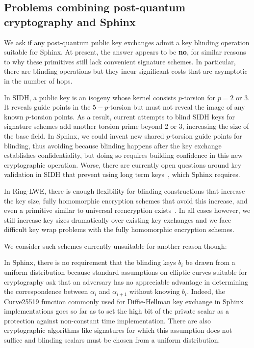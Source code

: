 \documentclass[twoside,letterpaper]{llncs}
\begin{document}
\subsection{Problems combining post-quantum cryptography and Sphinx}

We ask if any post-quantum public key exchanges admit 
a key blinding operation suitable for Sphinx. 
At present, the answer appears to be {\bf no}, for similar reasons to
why these primitives still lack convenient signature schemes. 
In particular, there are blinding operations but they incur significant
costs  that are asymptotic in the number of hops.

In SIDH, a public key is an isogeny whose kernel consists $p$-torsion
for $p=2$ or $3$.  It reveals guide points in the $5-p$-torsion but
must not reveal the image of any known $p$-torsion points.  
As a result, current attempts to blind SIDH keys for signature schemes
add another torsion prime beyond 2 or 3, increasing the size of the
base field.  In Sphinx, we could invent new shared $p$-torsion guide
points for blinding, thus avoiding
because blinding happens after the key exchange
establishes confidentiality, but doing so requires building confidence
in this new cryptographic operation.  Worse, there are currently open
questions around key validation in SIDH that prevent using long term
keys~\cite{SIDH-NoValidation}, which Sphinx requires.

In Ring-LWE, there is enough flexibility for blinding constructions
that increase the key size, fully homomorphic encryption schemes that
avoid this increase, and even a primitive similar to universal
reencryption exists~\cite{963628}.  In all cases however, we still
increase key sizes dramatically over existing key exchanges and we face
difficult key wrap problems with the fully homomorphic encryption
schemes.

We consider such schemes currently unsuitable for another reason though: 

In Sphinx, there is no requirement that the blinding keys $b_i$ be
drawn from a uniform distribution because standard assumptions on
elliptic curves suitable for cryptography ask that an adversary has
no appreciable advantage in determining the correspondence between
$\alpha_i$ and $\alpha_{i+1}$ without knowing $b_i$.  
Indeed, the Curve25519 function commonly used for Diffie-Hellman key
exchange in Sphinx implementations goes so far as to set the high bit
of the private scalar as a protection against non-constant time
implementation.
There are also cryptographic algorithms like signatures for which
this assumption does not suffice and blinding scalars must be chosen
from a uniform distribution.
\end{document}
